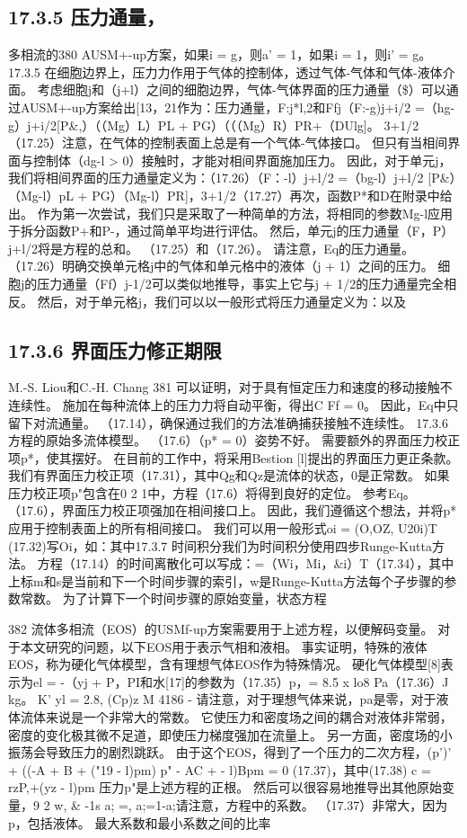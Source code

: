 \documentclass[UTF8,11pt,a4paper,openany,fontset=fandol]{ctexbook}
\begin{document}
\subsection{17.3.5 压力通量，}
多相流的380 AUSM+-up方案，如果i = g，则a' = 1，如果i = 1，则i' = g。 17.3.5 在细胞边界上，压力力作用于气体的控制体，透过气体-气体和气体-液体介面。 考虑细胞j和（j+l）之间的细胞边界，气体-气体界面的压力通量（\$）可以通过AUSM+-up方案给出[13，21作为：压力通量，F:j*l,2和Ffj（F:-g)j+i/2 =（hg-g）j+i/2[P\&,）（（Mg）L）PL + PG）（（（Mg）R）PR+（DUlg]。 3+1/2（17.25）注意，在气体的控制表面上总是有一个气体-气体接口。 但只有当相间界面与控制体（dg-l > 0）接触时，才能对相间界面施加压力。 因此，对于单元j，我们将相间界面的压力通量定义为：（17.26）（F：-l）j+l/2 =（bg-l）j+l/2 [P\&）（Mg-l）pL + PG）（Mg-l）PR]，3+1/2（17.27）再次，函数P*和D在附录中给出。 作为第一次尝试，我们只是采取了一种简单的方法，将相同的参数Mg-l应用于拆分函数P+和P-，通过简单平均进行评估。 然后，单元j的压力通量（F，P）j+l/2将是方程的总和。 （17.25）和（17.26）。 请注意，Eq的压力通量。 （17.26）明确交换单元格j中的气体和单元格中的液体（j + 1）之间的压力。 细胞j的压力通量（Ff）j-1/2可以类似地推导，事实上它与j + 1/2的压力通量完全相反。 然后，对于单元格j，我们可以以一般形式将压力通量定义为：以及

\subsection{17.3.6 界面压力修正期限}
M.-S. Liou和C.-H. Chang 381 可以证明，对于具有恒定压力和速度的移动接触不连续性。 施加在每种流体上的压力力将自动平衡，得出C Ff = 0。 因此，Eq中只留下对流通量。 （17.14），确保通过我们的方法准确捕获接触不连续性。 17.3.6 方程的原始多流体模型。 （17.6）（p* = 0）姿势不好。 需要额外的界面压力校正项p*，使其摆好。 在目前的工作中，将采用Bestion [l]提出的界面压力更正条款。 我们有界面压力校正项（17.31），其中Qg和Qz是流体的状态，0是正常数。 如果压力校正项p"包含在0 2 1中，方程（17.6）将得到良好的定位。 参考Eq。 （17.6），界面压力校正项强加在相间接口上。 因此，我们遵循这个想法，并将p*应用于控制表面上的所有相间接口。 我们可以用一般形式oi = (O,OZ, U20i)T (17.32)写Oi，如：其中17.3.7 时间积分我们为时间积分使用四步Runge-Kutta方法。 方程（17.14）的时间离散化可以写成：=（Wi，Mi，\&i）T（17.34），其中上标m和s是当前和下一个时间步骤的索引，w是Runge-Kutta方法每个子步骤的参数常数。 为了计算下一个时间步骤的原始变量，状态方程

382 流体多相流（EOS）的USMf-up方案需要用于上述方程，以便解码变量。 对于本文研究的问题，以下EOS用于表示气相和液相。 事实证明，特殊的液体EOS，称为硬化气体模型，含有理想气体EOS作为特殊情况。 硬化气体模型[8]表示为el = -（yj + P，PI和水[17]的参数为（17.35）p，= 8.5 x lo8 Pa（17.36）J kg。 K' yl = 2.8, (Cp)z M 4186 - 请注意，对于理想气体来说，pa是零，对于液体流体来说是一个非常大的常数。 它使压力和密度场之间的耦合对液体非常弱，密度的变化极其微不足道，即使压力梯度强加在流量上。 另一方面，密度场的小振荡会导致压力的剧烈跳跃。 由于这个EOS，得到了一个压力的二次方程，(p')' + ((-A + B + ("19 - l)pm) p" - AC + - l)Bpm = 0 (17.37)，其中(17.38) c = rzP,+(yz - l)pm 压力p"是上述方程的正根。 然后可以很容易地推导出其他原始变量，9 2 w, \& -1s a; =, a;=1-a;请注意，方程中的系数。 （17.37）非常大，因为p，包括液体。 最大系数和最小系数之间的比率
\end{document}
